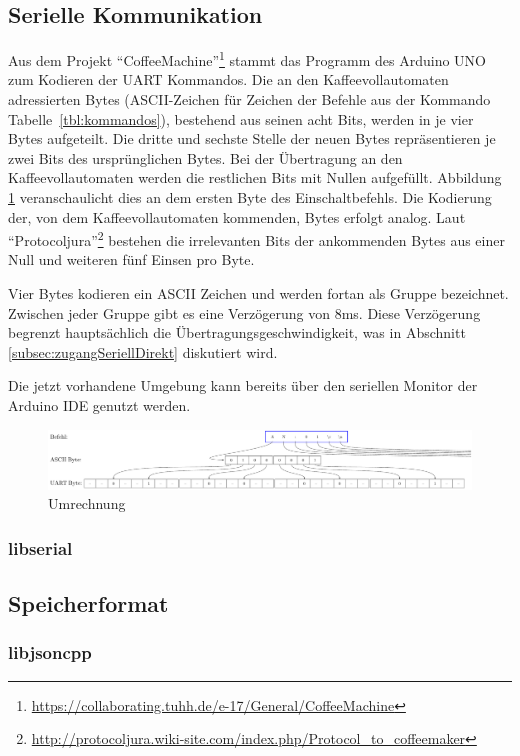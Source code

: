 \subsection{Serielle Kommunikation}\label{subsec:SerielleKommunikation}
Aus dem Projekt "`CoffeeMachine"'\footnote{\label{GitlabProject_CoffeeMachine}\href{https://collaborating.tuhh.de/e-17/General/CoffeeMachine}{https://collaborating.tuhh.de/e-17/General/CoffeeMachine}} stammt das Programm des Arduino UNO zum Kodieren der \ac{UART} Kommandos. Die an den Kaffeevollautomaten adressierten Bytes (ASCII-Zeichen für Zeichen der Befehle aus der Kommando Tabelle~\ref{tbl:kommandos}), bestehend aus seinen acht Bits, werden in je vier Bytes aufgeteilt. Die dritte und sechste Stelle der neuen Bytes repräsentieren je zwei Bits des ursprünglichen Bytes. Bei der Übertragung an den Kaffeevollautomaten werden die restlichen Bits mit Nullen aufgefüllt. Abbildung \ref{fig:uart} veranschaulicht dies an dem ersten Byte des Einschaltbefehls.
Die Kodierung der, von dem Kaffeevollautomaten kommenden, Bytes erfolgt analog. Laut "`Protocoljura"'\footnote{\url{http://protocoljura.wiki-site.com/index.php/Protocol_to_coffeemaker}} bestehen die irrelevanten Bits der ankommenden Bytes aus einer Null und weiteren fünf Einsen pro Byte.

Vier Bytes kodieren ein ASCII Zeichen und werden fortan als Gruppe bezeichnet. Zwischen jeder Gruppe gibt es eine Verzögerung von 8ms. Diese Verzögerung begrenzt hauptsächlich die Übertragungsgeschwindigkeit, was in Abschnitt \ref{subsec:zugangSeriellDirekt} diskutiert wird.

Die jetzt vorhandene Umgebung kann bereits über den seriellen Monitor der Arduino IDE genutzt werden.

\begin{figure}
  \begin{center}
    \includegraphics[scale=0.4]{images/UART-Bytes}
    \caption{Umrechnung }
    \label{fig:uart}
  \end{center}
\end{figure}

\subsubsection{libserial}

\subsection{Speicherformat}

\subsubsection{libjsoncpp}



